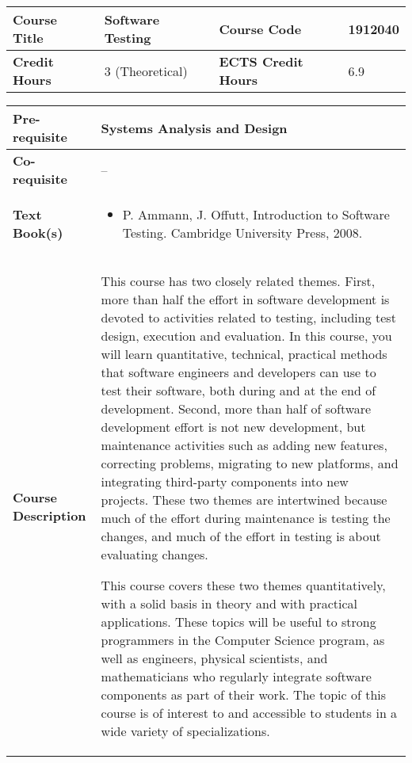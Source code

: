 \documentclass[12pt]{article}
\begin{document}
\bigskip
\bigskip


\begin{minipage}{\textwidth}
\begin{tabularx}{\textwidth}{|l|X|l|X|}
\hline
\textbf{Course Title}       &   Software Testing & \textbf{Course Code}       &  1912040  \\ \hline
\textbf{Credit Hours}       &  3 (Theoretical) & \textbf{ECTS Credit Hours}       &   6.9 \\ \hline
\end{tabularx}

\begin{tabularx}{\textwidth}{|l|X|}
\hline
\textbf{Pre-requisite}      &  Systems Analysis and Design \\ \hline
\textbf{Co-requisite}       &  -- \\ \hline
\textbf{Text Book(s)}      & \begin{minipage}{.70\textwidth}
					\begin{itemize} \itemsep-0.4em
						\vspace{3mm}
						\item P. Ammann, J. Offutt, Introduction to Software Testing. Cambridge University Press, 2008.
						\vspace{3mm}
					\end{itemize}
				\end{minipage}  \\ \hline
\textbf{Course Description} & \begin{minipage}{.70\textwidth}
					\vspace{3mm}
					This course has two closely related themes. First, more than half the effort in software development is devoted to activities related to testing, including test design, execution and evaluation. In this course, you will learn quantitative, technical, practical methods that software engineers and developers can use to test their software, both during and at the end of development. Second, more than half of software development effort is not new development, but maintenance activities such as adding new features, correcting problems, migrating to new platforms, and integrating third-party components into new projects. These two themes are intertwined because much of the effort during maintenance is testing the changes, and much of the effort in testing is about evaluating changes. 

					This course covers these two themes quantitatively, with a solid basis in theory and with practical applications. These topics will be useful to strong programmers in the Computer Science program, as well as engineers, physical scientists, and mathematicians who regularly integrate software components as part of their work. The topic of this course is of interest to and accessible to students in a wide variety of specializations. 

					\vspace{3mm}
					\end{minipage} \\ \hline
\end{tabularx}
\end{minipage}
\end{document}
